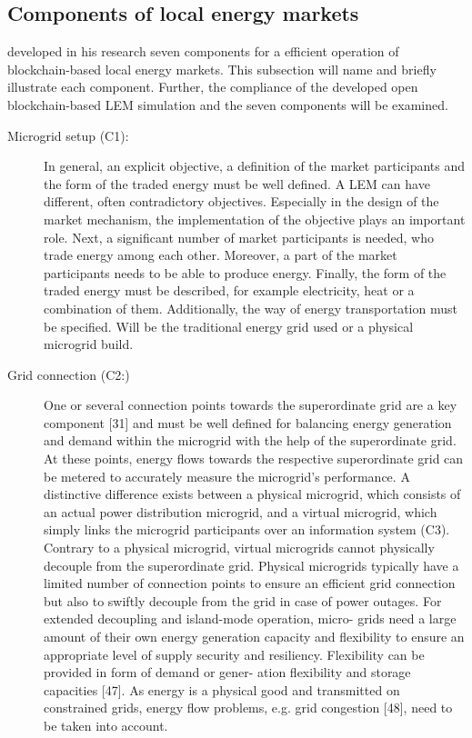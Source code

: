 \subsection{Components of local energy markets}
 developed in his research seven components for a efficient
operation of blockchain-based local energy markets. This subsection will name and briefly 
illustrate each component. Further, the compliance of the developed open blockchain-based
LEM simulation and the seven components will be examined.

\begin{description}
    \item[Microgrid setup (C1):] In general, an explicit objective, a definition of the market 
     participants and the form of the traded energy must be well defined. 
     A LEM can have different, often contradictory objectives. Especially in the
     design of the market mechanism, the implementation of the objective plays an important role.
     Next, a significant number of market participants is needed, who trade energy among each other.
     Moreover, a part of the market participants needs to be able to produce energy. 
     Finally, the form of the traded energy must be described, for example electricity, heat or a 
     combination of them. Additionally, the way of energy transportation must be specified.
     Will be the traditional energy grid used or a physical microgrid build. 
    
    \item[Grid connection (C2:)]
    
    One or several connection points towards the superordinate
    grid are a key component [31] and must be well defined for balancing
    energy generation and demand within the microgrid with the help 
    of the superordinate grid. At these points, energy flows towards 
    the respective superordinate grid can be metered to accurately measure 
    the microgrid’s performance. A distinctive difference exists between a 
    physical microgrid, which consists of an actual power distribution microgrid, 
    and a virtual microgrid, which simply links the microgrid participants 
    over an information system (C3). Contrary to a physical microgrid, 
    virtual microgrids cannot physically decouple from the superordinate grid. 
    Physical microgrids typically have a limited number of connection points to
    ensure an efficient grid connection but also to swiftly decouple from the grid in case of power outages. For extended decoupling and island-mode operation, micro-
    grids need a large amount of their own energy generation capacity and 
    flexibility to ensure an appropriate level of supply 
    security and resiliency. Flexibility can be provided in 
    form of demand or gener- ation flexibility and storage capacities [47]. 
    As energy is a physical good and transmitted on constrained grids, energy 
    flow problems, e.g. grid congestion [48], need to be taken into account.
    

\end{description}
